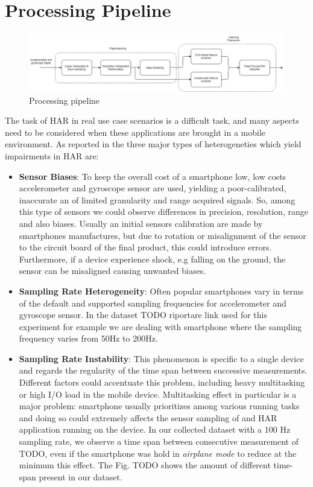 
\section{Processing Pipeline}
\label{sec:processing_architecture}

\begin{figure}[h]
	\centering
	\includegraphics[width=1\textwidth]{images/processing_pipeline.jpg}
	\caption{Processing pipeline}
\end{figure}

The task of HAR in real use case scenarios is a difficult task, and many aspects need to be considered when these applications are brought in a mobile environment. As reported in \cite{blunck2013heterogeneity} the three major types of heterogeneties which yield impairments in HAR are:
\begin{itemize}
	\item \textbf{Sensor Biases}: To keep the overall cost of a smartphone low, low costs accelerometer and gyroscope sensor are used, yielding a poor-calibrated, inaccurate an of limited granularity and range acquired signals. So, among this type of sensors we could observe differences in precision, resolution, range and also biases. Usually an initial sensors calibration are made by smartphones manufactures, but due to rotation or misalignment of the sensor to the circuit board of the final product, this could introduce errors. Furthermore, if a device experience shock, e.g falling on the ground, the sensor can be misaligned causing unwanted biases.
	\item \textbf{Sampling Rate Heterogeneity}: Often popular smartphones vary in terms of the default and supported sampling frequencies for accelerometer and gyroscope sensor. In the dataset TODO riportare link used for this experiment for example we are dealing with smartphone where the sampling frequency varies from 50Hz to 200Hz.
	\item \textbf{Sampling Rate Instability}: This phenomenon is specific to a single device and regards the regularity of the time span between successive measurements. Different factors could accentuate this problem, including heavy multitasking or high I/O load in the mobile device. Multitasking effect in particular is a major problem: smartphone usually prioritizes among various running tasks and doing so could extremely affects the sensor sampling of and HAR application running on the device. In our collected dataset with a 100 Hz sampling rate, we observe a time span between consecutive measurement of TODO, even if the smartphone was hold in \textit{airplane mode} to reduce at the minimum this effect. The Fig. TODO shows the amount of different time-span present in our dataset.
\end{itemize}

